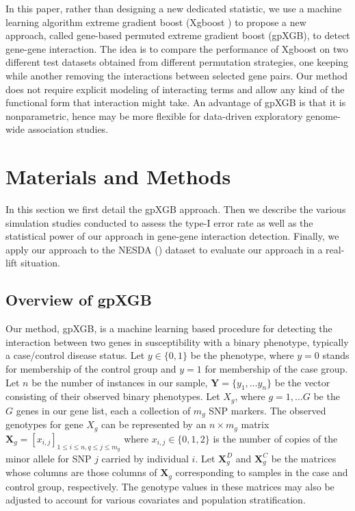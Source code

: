 \documentclass[11pt]{article}
\theoremstyle{plain}
\theoremstyle{definition}
\theoremstyle{remark}
\begin{document}
In this paper, rather than designing a new dedicated statistic, we use a machine learning algorithm extreme gradient boost (Xgboost \cite{9}) to propose a new approach, called gene-based permuted extreme gradient boost (gpXGB), to detect gene-gene interaction. The idea is to compare the performance of Xgboost on two different test datasets obtained from different permutation strategies, one keeping while another removing the interactions between selected gene pairs. Our method does not require explicit modeling of interacting terms and allow any kind of the functional form that interaction might take. An advantage of gpXGB is that it is nonparametric, hence may be more flexible for data-driven exploratory genome-wide association studies.

\section{Materials and Methods}


In this section we first detail the gpXGB approach. Then we describe the various simulation studies conducted to assess the type-I error rate as well as the statistical power of our approach in gene-gene interaction detection. Finally, we apply our approach to the{\color{red} NESDA ()} dataset to evaluate our approach in a real-lift situation.

\subsection{Overview of gpXGB}

Our method, gpXGB, is a machine learning based procedure for detecting the interaction between two genes in susceptibility with a binary phenotype, typically a case/control disease status. Let $y\in\{0,1\}$ be the phenotype, where $y=0$ stands for membership of the control group and $y=1$ for membership of the case group. Let $n$ be the number of instances in our sample, $\mathbf{Y}=\{y_1,\dots y_n\}$ be the vector consisting of their observed binary phenotypes. Let $X_g$, where $g=1,\dots G$ be the $G$ genes in our gene list, each a collection of $m_g$ SNP markers. The observed genotypes for gene $X_g$ can be represented by an $n\times m_g$ matrix $\mathbf{X}_g=\left[x_{i,j}\right]_{1\leq i\leq n,q\leq j\leq m_g}$ where $x_{i,j}\in\{0,1,2\}$ is the number of copies of the minor allele for SNP $j$ carried by individual $i$. Let $\mathbf{X}^D_g$ and $\mathbf{X}^C_g$ be the matrices whose columns are those columns of $\mathbf{X}_g$ corresponding to samples in the case and control group, respectively. The genotype values in these matrices may also be adjusted to account for various covariates and population stratification.\\
\end{document}
